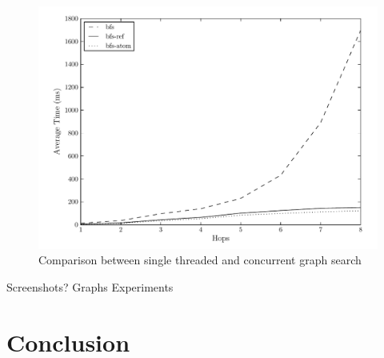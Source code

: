 \documentclass[12pt,letterpaper,oneside]{report}
\theoremstyle{definition}
\begin{document}
		\begin{figure}[!ht]
			\centering
			\includegraphics[scale=0.85]{growth}
			\caption{Comparison between single threaded and concurrent graph search}
			\label{fig:perf-growth}
		\end{figure}
		
%		
		
		Screenshots?
		Graphs
		Experiments
	
	\chapter{Conclusion}
	
	\printbibliography
\end{document}
